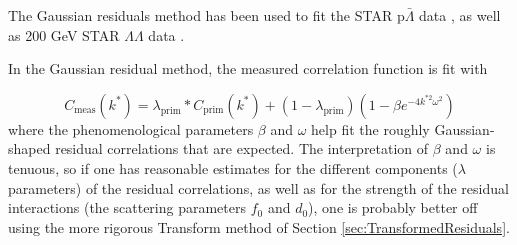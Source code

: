 The Gaussian residuals method has been used  to fit the STAR p$\bar{\Lambda}$ data \cite{Shapoval:2014yha}, as well as 200 GeV STAR $\Lambda\Lambda$ data \cite{Adamczyk:2014vca}.

In the Gaussian residual method, the measured correlation function is fit with 

\begin{equation}
\label{eq:GaussianResiduals}
C_{\mathrm{meas}}(k^*) = \lambda_{\mathrm{prim}}*C_{\mathrm{prim}}(k^*)+(1-\lambda_{\mathrm{prim}})(1-\beta  e^{-4k^{*2}\omega^2})
\end{equation}
where the phenomenological parameters $\beta$ and $\omega$ help fit the roughly Gaussian-shaped residual correlations that are expected.
The interpretation of $\beta$ and $\omega$ is tenuous, so if one has reasonable estimates for the different components ($\lambda$ parameters) of the residual correlations, as well as for the strength of the residual interactions (the scattering parameters $f_0$ and $d_0$), one is probably better off using the more rigorous Transform method of Section \ref{sec:TransformedResiduals}.





